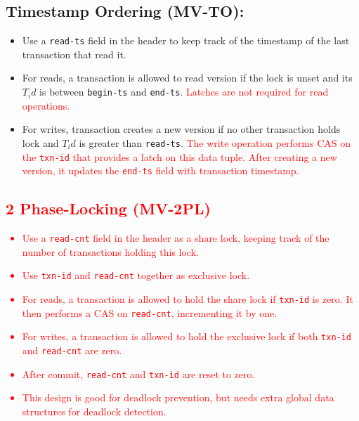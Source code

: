\documentclass[11pt]{article}
\newcommand{\rr}[1]{\textcolor{red}{#1}}
\begin{document}
\subsection*{Timestamp Ordering (MV-TO):}
\begin{itemize}
    \item
    Use a \texttt{read-ts} field in the header to keep track of the timestamp of the last 
    transaction that read it.
    
    \item
    For reads, a transaction is allowed to read version if the lock is unset and its $T_id$ is between 
    \texttt{begin-ts} and \texttt{end-ts}. \rr{Latches are not required for read operations.}
    
    \item
    For writes, transaction creates a new version if no other transaction holds lock and 
    $T_id$ is greater than \texttt{read-ts}. \rr{The write operation performs CAS on the \texttt{txn-id} that provides a latch on this data tuple. After creating a new version, it updates the \texttt{end-ts} field with transaction timestamp.}
\end{itemize}
\rr{\subsection*{2 Phase-Locking (MV-2PL)}
\begin{itemize}
    \item Use a \texttt{read-cnt} field in the header as a share lock, keeping track of the number of transactions holding this lock.
    \item Use \texttt{txn-id} and \texttt{read-cnt} together as exclusive lock.
    \item For reads, a transaction is allowed to hold the share lock if \texttt{txn-id} is zero. It then performs a CAS on \texttt{read-cnt}, incrementing it by one.
    \item For writes, a transaction is allowed to hold the exclusive lock if both \texttt{txn-id} and \texttt{read-cnt} are zero.
    \item After commit, \texttt{read-cnt} and \texttt{txn-id} are reset to zero.
    \item This design is good for deadlock prevention, but needs extra global data structures for deadlock detection.
\end{itemize}}

\end{document}
